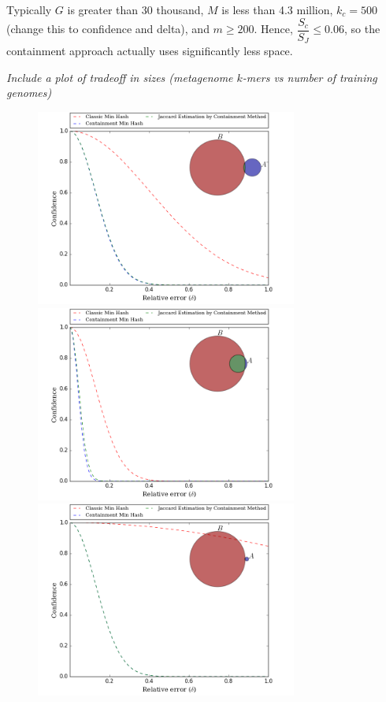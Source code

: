 \documentclass[11pt]{amsart}
\theoremstyle{remark}
\numberwithin{equation}{section}
\begin{document}
Typically $G$ is greater than 30 thousand, $M$ is less than 4.3 million, $k_c=500$ (change this to confidence and delta), and $m\geq 200$. Hence, $\dfrac{S_c}{S_J}\leq 0.06$, so the containment approach actually uses significantly less space.

\textit{Include a plot of tradeoff in sizes (metagenome $k$-mers vs number of training genomes)}

\begin{figure}[!h]%
\begin{center}
\includegraphics[width=3.39in,trim={0 0 0 0in},clip]{Figs/deltaConfident-1010.png}%
\hspace{-.327in}
\includegraphics[width=3.39in,trim={0 0 0 0in},clip]{Figs/deltaConfident-1090.png}\\
\includegraphics[width=3.39in,trim={0 0 0 0in},clip]{Figs/deltaConfident-20010.png}%

\end{center}
\end{figure}
\end{document}
